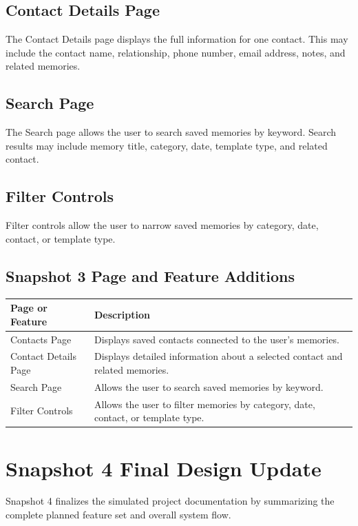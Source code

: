 \documentclass{article}
\begin{document}
\subsection{Contact Details Page}

The Contact Details page displays the full information for one contact. This may include the contact name, relationship, phone number, email address, notes, and related memories.

\subsection{Search Page}

The Search page allows the user to search saved memories by keyword. Search results may include memory title, category, date, template type, and related contact.

\subsection{Filter Controls}

Filter controls allow the user to narrow saved memories by category, date, contact, or template type.

\subsection{Snapshot 3 Page and Feature Additions}

\begin{longtable}{|p{4cm}|p{9cm}|}
\hline
Page or Feature & Description \\ \hline
Contacts Page & Displays saved contacts connected to the user's memories. \\ \hline
Contact Details Page & Displays detailed information about a selected contact and related memories. \\ \hline
Search Page & Allows the user to search saved memories by keyword. \\ \hline
Filter Controls & Allows the user to filter memories by category, date, contact, or template type. \\ \hline
\end{longtable}

\section{Snapshot 4 Final Design Update}

Snapshot 4 finalizes the simulated project documentation by summarizing the complete planned feature set and overall system flow.
\end{document}
